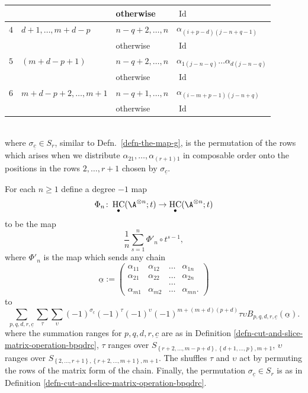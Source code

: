 \documentclass[12pt,a4paper,reqno]{amsart}
\DeclareMathOperator{\id}{Id}
\DeclareMathOperator{\hochcx}{{HC}}
\begin{document}
\begin{defn}
\begin{tabular}{|l|l|l|l|}
& 
&
otherwise
&
$\id$ 
\\
\hline
$4$
&
$d+1, \dots, m+d-p$
&
$n-q+2,\dots, n$
&
$\alpha_{(i+p-d)(j-n+q-1)}$
\\
&
&
otherwise
& 
$\id$  
\\
\hline
$5$
&
$(m+d-p+1)$
& 
$n-q+2,\dots,n$
&
$\alpha_{1(j-n-q)}\dots\alpha_{d(j-n-q)}$  
\\
&
&
otherwise
&
$\id$  
\\
\hline
$6$
&
$m+d-p+2, \dots, m+1$
& 
$n-q+1,\dots,n$  
&
$\alpha_{(i-m+p-1)(j-n+q)}$ 
\\
&
& 
otherwise
&
$\id$ 
\\
\hline
\end{tabular}
\\
where $\sigma_{\underline{c}} \in S_r$, similar to 
Defn.~\ref{defn-the-map-g}, is the permutation of the rows
which arises when we distribute  
$\alpha_{21}, \dots, \alpha_{(r+1)1}$ in composable order
onto the positions in the rows $2,\dots,r+1$ chosen by
$\sigma_{\underline{c}}$. 
\end{defn}

\begin{defn}
\label{defn-map-phi-n}
For each $n \geq 1$ define a degree $-1$ map 
$$ \Phi_n\colon \hochcx_\bullet(\A^{\otimes n}; t) \rightarrow \hochcx_\bullet(\A^{\otimes n}; t) $$
to be the map 
\begin{equation}
\label{eqn-defn-of-psi-n}
\frac{1}{n}\sum_{s=1}^n \Phi'_n \circ t^{s-1}, 
\end{equation}
where $\Phi'_n$ is the map
which sends any chain 
\begin{equation*}
\underline{\alpha}
:= 
\begin{pmatrix}
\alpha_{11} & \alpha_{12} & \dots & \alpha_{1n}  
\\
\alpha_{21} & \alpha_{22} & \dots & \alpha_{2n}  
\\
& & \dots & 
\\
\alpha_{m1} & \alpha_{m2} & \dots & \alpha_{mn}. 
\end{pmatrix} 
\end{equation*}
to
\begin{equation}
\label{eqn-defn-of-psi'-n}
\sum_{p, q, d, r, \underline{c}}
\sum_{\tau }
\sum_{\upsilon}
(-1)^{\sigma_{\underline{c}}}
(-1)^{\tau}
(-1)^{\upsilon} 
(-1)^{m+(m+d)(p+d)}
\tau \upsilon B_{p,q,d,r,\underline{c}} \left( \underline{\alpha} \right). 
\end{equation}
where the summation ranges for $p,q,d,r, \underline{c}$ are as in
Definition \ref{defn-cut-and-slice-matrix-operation-bpqdrc}, 
$\tau$ ranges over  
$S_{\left\{r+2, \dots, m-p+d\right\}, \left\{d+1, \dots,
p\right\}, m+1}$, $\upsilon$ ranges over  
$S_{\left\{2, \dots, r+1\right\}, \left\{r+2, \dots, m+1\right\},
m+1}$.
The shuffles $\tau$ and $\upsilon$ act by permuting
the rows of the matrix form of the chain. Finally, 
the permutation $\sigma_{\underline{c}} \in S_r$ is as in  
Definition \ref{defn-cut-and-slice-matrix-operation-bpqdrc}. 
\end{defn}
\end{document}
